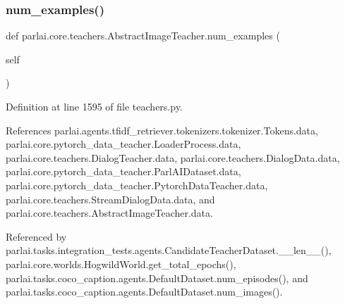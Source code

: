 \subsubsection{\texorpdfstring{num\+\_\+examples()}{num\_examples()}}
{\footnotesize\ttfamily def parlai.\+core.\+teachers.\+Abstract\+Image\+Teacher.\+num\+\_\+examples (\begin{DoxyParamCaption}\item[{}]{self }\end{DoxyParamCaption})}



Definition at line 1595 of file teachers.\+py.



References parlai.\+agents.\+tfidf\+\_\+retriever.\+tokenizers.\+tokenizer.\+Tokens.\+data, parlai.\+core.\+pytorch\+\_\+data\+\_\+teacher.\+Loader\+Process.\+data, parlai.\+core.\+teachers.\+Dialog\+Teacher.\+data, parlai.\+core.\+teachers.\+Dialog\+Data.\+data, parlai.\+core.\+pytorch\+\_\+data\+\_\+teacher.\+Parl\+A\+I\+Dataset.\+data, parlai.\+core.\+pytorch\+\_\+data\+\_\+teacher.\+Pytorch\+Data\+Teacher.\+data, parlai.\+core.\+teachers.\+Stream\+Dialog\+Data.\+data, and parlai.\+core.\+teachers.\+Abstract\+Image\+Teacher.\+data.



Referenced by parlai.\+tasks.\+integration\+\_\+tests.\+agents.\+Candidate\+Teacher\+Dataset.\+\_\+\+\_\+len\+\_\+\+\_\+(), parlai.\+core.\+worlds.\+Hogwild\+World.\+get\+\_\+total\+\_\+epochs(), parlai.\+tasks.\+coco\+\_\+caption.\+agents.\+Default\+Dataset.\+num\+\_\+episodes(), and parlai.\+tasks.\+coco\+\_\+caption.\+agents.\+Default\+Dataset.\+num\+\_\+images().

